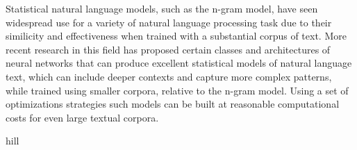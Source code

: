


%
Statistical natural language models, such as the n-gram model, have
seen widespread use for a variety of natural language processing task
due to their similicity and effectiveness when trained with a
substantial corpus of text. More recent research in this field has
proposed certain classes and architectures of neural networks that can
produce excellent statistical models of natural language text, which
can include deeper contexts and capture more complex patterns, while
trained using smaller corpora, relative to the n-gram model. Using a
set of optimizations strategies such models can be built at reasonable
computational costs for even large textual corpora.









hill~\cite{hill_use_2014}
